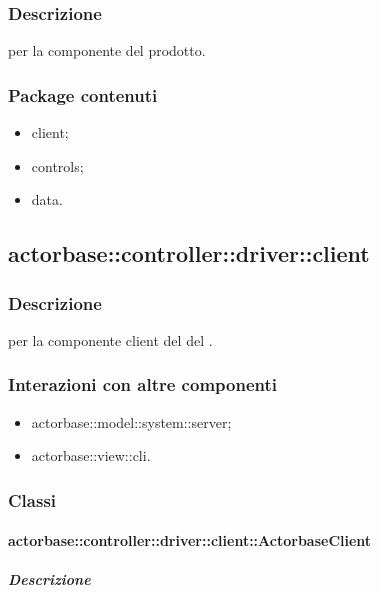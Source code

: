 \documentclass{scalatekids-article}
\begin{document}
\subsubsection{Descrizione}

 per la componente  del prodotto.

\subsubsection{Package contenuti}

\begin{itemize}
\item client;
\item controls;
\item data.
\end{itemize}

\subsection{actorbase::controller::driver::client}

\subsubsection{Descrizione}

 per la componente client del  del .

\subsubsection{Interazioni con altre componenti}

\begin{itemize}
\item actorbase::model::system::server;
\item actorbase::view::cli.%
\end{itemize}

\subsubsection{Classi}

\paragraph{actorbase::controller::driver::client::ActorbaseClient}

\subparagraph{Descrizione}
\end{document}
